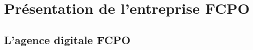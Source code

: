 %
%
%
%
%
%
%
%
%
%
%
%     
%     
%
%
%
%
%
%
%
%
%
%
%
%
%
%

\section{Présentation de l’entreprise FCPO}



\subsection{L’agence digitale FCPO}

